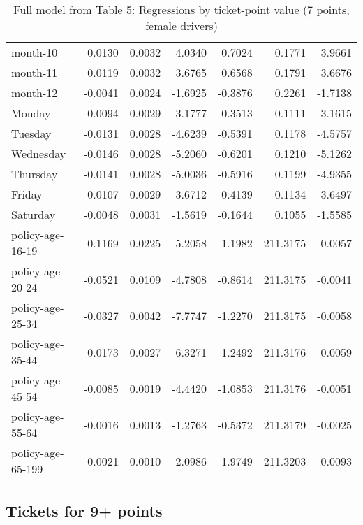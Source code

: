 \documentclass[10pt]{article}
\begin{document}
\begin{table}[ht]
\begin{tabular}{lrrrrrr}
  month-10 & 0.0130 & 0.0032 & 4.0340 & 0.7024 & 0.1771 & 3.9661 \\ 
  month-11 & 0.0119 & 0.0032 & 3.6765 & 0.6568 & 0.1791 & 3.6676 \\ 
  month-12 & -0.0041 & 0.0024 & -1.6925 & -0.3876 & 0.2261 & -1.7138 \\ 
  Monday & -0.0094 & 0.0029 & -3.1777 & -0.3513 & 0.1111 & -3.1615 \\ 
  Tuesday & -0.0131 & 0.0028 & -4.6239 & -0.5391 & 0.1178 & -4.5757 \\ 
  Wednesday & -0.0146 & 0.0028 & -5.2060 & -0.6201 & 0.1210 & -5.1262 \\ 
  Thursday & -0.0141 & 0.0028 & -5.0036 & -0.5916 & 0.1199 & -4.9355 \\ 
  Friday & -0.0107 & 0.0029 & -3.6712 & -0.4139 & 0.1134 & -3.6497 \\ 
  Saturday & -0.0048 & 0.0031 & -1.5619 & -0.1644 & 0.1055 & -1.5585 \\ 
  policy-age-16-19 & -0.1169 & 0.0225 & -5.2058 & -1.1982 & 211.3175 & -0.0057 \\ 
  policy-age-20-24 & -0.0521 & 0.0109 & -4.7808 & -0.8614 & 211.3175 & -0.0041 \\ 
  policy-age-25-34 & -0.0327 & 0.0042 & -7.7747 & -1.2270 & 211.3175 & -0.0058 \\ 
  policy-age-35-44 & -0.0173 & 0.0027 & -6.3271 & -1.2492 & 211.3176 & -0.0059 \\ 
  policy-age-45-54 & -0.0085 & 0.0019 & -4.4420 & -1.0853 & 211.3176 & -0.0051 \\ 
  policy-age-55-64 & -0.0016 & 0.0013 & -1.2763 & -0.5372 & 211.3179 & -0.0025 \\ 
  policy-age-65-199 & -0.0021 & 0.0010 & -2.0986 & -1.9749 & 211.3203 & -0.0093 \\ 
   \hline
\end{tabular}
\caption{Full model from Table 5: Regressions by ticket-point value (7 points, female drivers)} 
\label{tab_5_7_pts_F}
\end{table}


\clearpage
\pagebreak




\subsection{Tickets for 9+ points}
\end{document}
